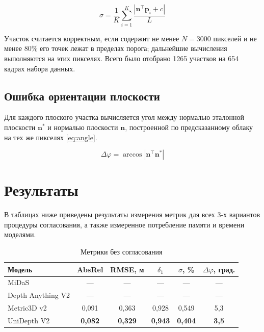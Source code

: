\documentclass{misisarticle}
\begin{document}
\begin{equation}
  \sigma = \frac{1}{K}\sum_{i=1}^{K} \frac{|\mathbf{n}^{\top}\mathbf{p}_i + c|}{L}
  \label{eq:sigma}
\end{equation}

Участок считается корректным, если содержит не менее $N = 3000$ пикселей и не менее 80\% его точек лежат в пределах порога; дальнейшие вычисления выполняются на этих пикселях. Всего было отобрано 1265 участков на 654 кадрах набора данных.

\subsection{Ошибка ориентации плоскости}

Для каждого плоского участка вычисляется угол между нормалью эталонной плоскости $\mathbf{n}^*$ и нормалью плоскости $\mathbf{n}$, построенной по предсказанному облаку на тех же пикселях \eqref{eq:angle}.

\begin{equation}
  \Delta\varphi = \arccos\left|\mathbf{n}^{\top}\mathbf{n}^*\right|
  \label{eq:angle}
\end{equation}

\section{Результаты}

В таблицах ниже приведены результаты измерения метрик для всех 3-х вариантов процедуры согласования, а также измеренное потребление памяти и времени моделями.

\begin{table}[H]
  \caption{Метрики без согласования}
  \label{tab:none}
  \centering
  \footnotesize
  \setlength{\tabcolsep}{3pt}
  \begin{tabular}{lccccc}
    \toprule
    \textbf{Модель} & \textbf{AbsRel} & \textbf{RMSE, м} & \textbf{$\delta_1$} & \textbf{$\sigma$, \%} & \textbf{$\Delta\varphi$, град.} \\
    \midrule
    MiDaS & --- & --- & --- & --- & --- \\
    Depth Anything V2 & --- & --- & --- & --- & --- \\
    Metric3D v2 & 0,091 & 0,363 & 0,928 & 0,549 & 5,3 \\
    UniDepth V2 & \textbf{0,082} & \textbf{0,329} & \textbf{0,943} & \textbf{0,404} & \textbf{3,5} \\
    \bottomrule
  \end{tabular}
\end{table}
\end{document}
